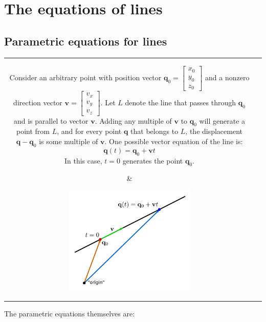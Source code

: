 \documentclass{article}
\begin{document}
\section*{The equations of lines}

\subsection*{Parametric equations for lines}

\begin{tabular}{cc}
\parbox{0.5\textwidth}{
Consider an arbitrary point with position vector \(\mathbf{q}_0 = \begin{bmatrix} x_0 \\ y_0 \\ z_0 \end{bmatrix}\) and a nonzero direction vector \(\mathbf{v} = \begin{bmatrix} v_x \\ v_y \\ v_z \end{bmatrix}\). Let \(L\) denote the line that passes through \(\mathbf{q}_0\) and is parallel to vector \(\mathbf{v}\). Adding any multiple of \(\mathbf{v}\) to \(\mathbf{q}_0\) will generate a point from \(L\), and for every point \(\mathbf{q}\) that belongs to \(L\), the displacement \(\mathbf{q} - \mathbf{q}_0\) is some multiple of \(\mathbf{v}\). One possible vector equation of the line is:
\[\mathbf{q}(t) = \mathbf{q}_0 + \mathbf{v}t\]
In this case, \(t = 0\) generates the point \(\mathbf{q}_0\). 
} & \parbox{0.5\textwidth}{
\includegraphics[width = 0.5\textwidth]{vector_equation_line}
}
\end{tabular}
The parametric equations themselves are:
\end{document}

